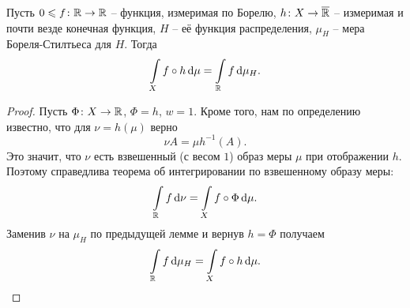 \begin{theorem}
    Пусть $0 \leqslant f \colon \mathbb{R} \to \mathbb{R}$ -- функция, измеримая по Борелю,
    $h \colon X \to \overline{\mathbb{R}}$ -- измеримая и почти везде конечная функция,
    $H$ -- её функция распределения, $\mu_H$ -- мера Бореля-Стилтьеса для $H$.
    Тогда
\[
    \int\limits_{X}{f \circ h \,\mathrm{d}\mu} = \int\limits_{\mathbb{R}}{f \,\mathrm{d}\mu_H}
.\] 
\end{theorem}
\begin{proof}
    Пусть $\Phi \colon X \to \mathbb{R}$, $\Phi = h$, $w = 1$. Кроме того, нам по определению известно,
    что для $\nu = h(\mu)$ верно
    \[
        \nu{A} = \mu{h^{-1}(A)}
    .\]
    Это значит, что $\nu$ есть взвешенный (с весом $1$) образ меры $\mu$ при отображении $h$.
    Поэтому справедлива теорема об интегрировании по взвешенному образу меры:
    \[
        \int\limits_{\mathbb{R}}{f \,\mathrm{d} \nu} = \int\limits_{X}{f \circ \Phi \,\mathrm{d}\mu}
    .\]
    Заменив $\nu$ на $\mu_H$ по предыдущей лемме и вернув $h = \Phi$ получаем
    \[
        \int\limits_{\mathbb{R}}{f \,\mathrm{d}\mu_H} = \int\limits_{X}{f \circ h \,\mathrm{d}\mu}
    .\]
\end{proof}

